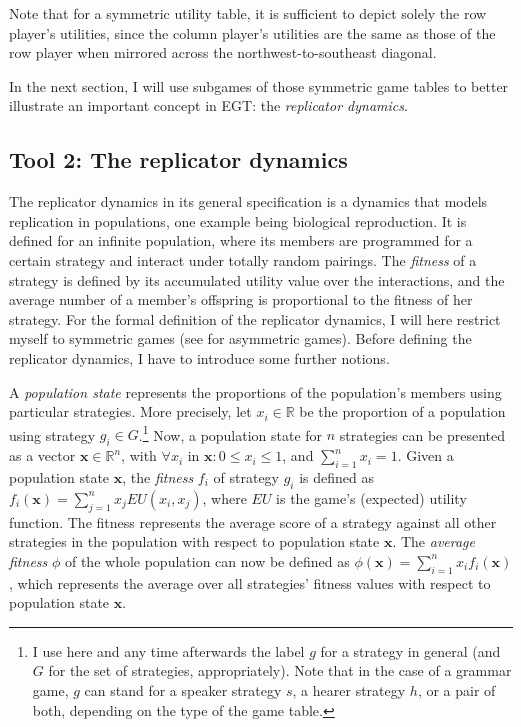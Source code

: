 \documentclass[output=paper,hidelinks]{langscibook}
\begin{document}
Note that for a symmetric utility table, it is sufficient to depict solely the row player's utilities, since the column player's utilities are the same as those of the row player when mirrored across the northwest-to-southeast diagonal.

In  the next section, I will use subgames of those symmetric game tables to better illustrate an important concept in EGT: the \emph{replicator dynamics}.


\subsection{Tool 2: The replicator dynamics}

The replicator dynamics in its general specification is a dynamics that models replication in populations, one example being biological reproduction. It is defined for an infinite population, where its members are programmed for a certain strategy and interact under totally random pairings. 
The \emph{fitness} of a strategy is defined by its accumulated utility value over the interactions, and the average number of a member's offspring is proportional to the fitness of her strategy.
For the formal definition of the replicator dynamics, I will here restrict myself to symmetric games (see \citealt{HofbauerSigmund1988} for asymmetric games). Before defining the replicator dynamics, I have to introduce some further notions.

A \emph{population state}  represents the proportions of the population's members using particular strategies. More precisely, let $x_i \in \mathbb{R}$ be the proportion of a population using strategy $g_i \in G$.\footnote{I use here and any time afterwards the label $g$ for a strategy in general (and $G$ for the set of strategies, appropriately). Note that in the case of a grammar game, $g$ can stand for a speaker strategy $s$, a hearer strategy $h$, or a pair of both, depending on the type of the game table.} Now, a population state for $n$ strategies can be presented as a vector $\textbf{x} \in \mathbb{R} ^n$, with $\forall x_i$ in $\textbf{x}: 0 \leq x_i \leq 1$, and $\sum_{i=1}^n x_i= 1$.
Given a population state $\textbf{x}$, the \emph{fitness} $f_i$ of strategy $g_i$ is defined as $f_i(\textbf{x}) = \sum_{j=1}^n x_j EU(x_i,x_j)$, where $EU$ is the game's (expected) utility function. The fitness represents the average score of a strategy against all other strategies in the population with respect to population state $\textbf{x}$. The \emph{average fitness} $\phi$ of the whole population can now be defined as $\phi(\textbf{x}) = \sum_{i=1}^n x_i f_i(\textbf{x})$, which represents the average over all strategies' fitness values with respect to population state $\textbf{x}$.
\end{document}

